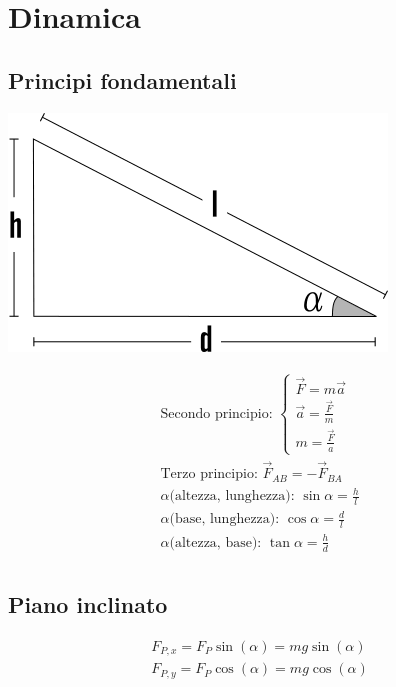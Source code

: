 \section{Dinamica}

\subsection{Principi fondamentali}

\begin{center}
    \includegraphics[width=0.6\linewidth]{Dinamica/piano-inclinato-senza-angolo.png} \\    
\end{center}

\begin{gather*}
\text{Secondo principio: }
\begin{cases}
    \vec{F} = m \vec{a} \\
    \vec{a} = \frac{\vec{F}}{m} \\
    m = \frac{\vec{F}}{a}
\end{cases} \\
\text{Terzo principio: } \vec{F}_{AB} = -\vec{F}_{BA} \\
\text{$\alpha$(altezza, lunghezza): }\sin{\alpha} = \frac{h}{l} \\ 
\text{$\alpha$(base, lunghezza): }\cos{\alpha} = \frac{d}{l} \\
\text{$\alpha$(altezza, base): }\tan{\alpha} = \frac{h}{d} \\
\end{gather*}
\subsection{Piano inclinato}
\begin{gather*}
    F_{P, x} = F_P \sin (\alpha) = m g \sin (\alpha) \\
    F_{P, y} = F_P \cos (\alpha) = m g \cos (\alpha) 
\end{gather*}
